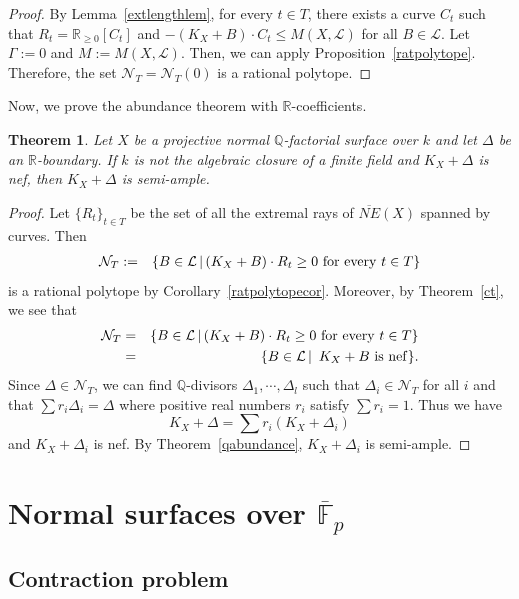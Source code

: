 \documentclass[12pt,twoside]{amsart}
\newtheorem{thm}{Theorem}[section]
\theoremstyle{definition}
\newcommand{\Q}{$\mathbb{Q}$}
\begin{document}
\begin{proof}
By Lemma~\ref{extlengthlem}, 
for every $t\in T$, there exists a curve $C_t$ 
such that $R_t=\mathbb R_{\geq 0}[C_t]$ and 
$-(K_X+B)\cdot C_t\leq M(X, \mathcal L)$ for all $B\in \mathcal L$. 
Let $\Gamma:=0$ and $M:=M(X, \mathcal L)$. 
Then, we can apply Proposition~\ref{ratpolytope}. 
Therefore, the set $\mathcal{N}_T=\mathcal{N}_T(0)$
is a rational polytope.
\end{proof}


Now, we prove the abundance theorem with $\mathbb{R}$-coefficients. 

\begin{thm}\label{abundance}
Let $X$ be a projective normal \Q-factorial surface over $k$ and 
let $\Delta$ be an $\mathbb{R}$-boundary. 
If $k$ is not the algebraic closure of a finite field and 
$K_X+\Delta$ is nef, then $K_X+\Delta$ is semi-ample. 
\end{thm}

\begin{proof}
Let $\{R_t\}_{t\in T}$ be the set of all the extremal rays of 
$\overline{NE}(X)$ spanned by curves. 
Then 
\begin{eqnarray*}
\mathcal N_T&:=&\{B\in \mathcal L \,|\,
(K_X+B)\cdot R_t\geq 0\,\,{\rm for\,\,every}\,\,t\in T\}
\end{eqnarray*}
is a rational polytope by Corollary~\ref{ratpolytopecor}. 
Moreover, by Theorem~\ref{ct}, we see that 
\begin{eqnarray*}
\mathcal N_T&=&\{B\in \mathcal L \,|\,
(K_X+B)\cdot R_t\geq 0\,\,{\rm for\,\,every}\,\,t\in T\}\\
&=&\{B\in \mathcal L \,|\,\,\,K_X+B\,\,{\rm is\,\,nef}\}.
\end{eqnarray*}
Since $\Delta\in \mathcal N_T$, 
we can find \Q-divisors $\Delta_1, \cdots, \Delta_l$  
such that $\Delta_i\in \mathcal N_T$ for all $i$ and 
that $\sum r_i\Delta_i=\Delta$ 
where positive real numbers $r_i$ satisfy $\sum r_i=1$. 
Thus we have 
$$K_X+\Delta=\sum r_i(K_X+\Delta_i)$$
and $K_X+\Delta_i$ is nef. 
By Theorem~\ref{qabundance}, 
$K_X+\Delta_i$ is semi-ample. 
\end{proof}



\section{Normal surfaces over $\overline{\mathbb{F}}_p$}

\subsection{Contraction problem}
\end{document}
